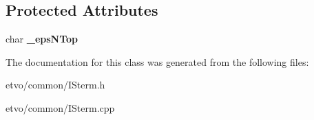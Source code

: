 \subsection*{Protected Attributes}
\begin{DoxyCompactItemize}
\item 
\mbox{\label{classetvo_i_i_1_1_i_sterm_a56a97132b14d7517f179b12f51a10e45}} 
char {\bfseries \+\_\+eps\+N\+Top}
\end{DoxyCompactItemize}


The documentation for this class was generated from the following files\+:\begin{DoxyCompactItemize}
\item 
etvo/common/I\+Sterm.\+h\item 
etvo/common/I\+Sterm.\+cpp\end{DoxyCompactItemize}

